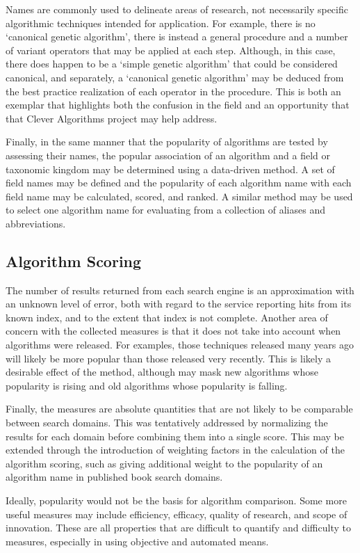 \documentclass[a4paper, 11pt]{article}
\begin{document}
Names are commonly used to delineate areas of research, not necessarily specific algorithmic techniques intended for application. For example, there is no `canonical genetic algorithm', there is instead a general procedure and a number of variant operators that may be applied at each step. Although, in this case, there does happen to be a `simple genetic algorithm' that could be considered canonical, and separately, a `canonical genetic algorithm' may be deduced from the best practice realization of each operator in the procedure. This is both an exemplar that highlights both the confusion in the field and an opportunity that that Clever Algorithms project may help address.

Finally, in the same manner that the popularity of algorithms are tested by assessing their names, the popular association of an algorithm and a field or taxonomic kingdom may be determined using a data-driven method. A set of field names may be defined and the popularity of each algorithm name with each field name may be calculated, scored, and ranked. A similar method may be used to select one algorithm name for evaluating from a collection of aliases and abbreviations.

\subsection{Algorithm Scoring}
The number of results returned from each search engine is an approximation with an unknown level of error, both with regard to the service reporting hits from its known index, and to the extent that index is not complete. Another area of concern with the collected measures is that it does not take into account when algorithms were released. For examples, those techniques released many years ago will likely be more popular than those released very recently. This is likely a desirable effect of the method, although may mask new algorithms whose popularity is rising and old algorithms whose popularity is falling. 

Finally, the measures are absolute quantities that are not likely to be comparable between search domains. This was tentatively addressed by normalizing the results for each domain before combining them into a single score. This may be extended through the introduction of weighting factors in the calculation of the algorithm scoring, such as giving additional weight to the popularity of an algorithm name in published book search domains.

Ideally, popularity would not be the basis for algorithm comparison. Some more useful measures may include efficiency, efficacy, quality of research, and scope of innovation. These are all properties that are difficult to quantify and difficulty to measures, especially in using objective and automated means.  
\end{document}
